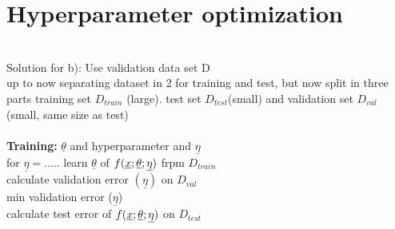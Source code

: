 \section{Hyperparameter optimization}
 \\
Solution for b): Use validation data set D\\
up to now separating dataset in 2 for training and test, but now split in three parts training set $ D_{train} $ (large). test set $ D_{test} $(small) and validation set $ D_{val} $ (small, same size as test)\\
 \\
\textbf{Training:} $ \underline{\theta} $ and hyperparameter and $ \underline{\eta} $\\
for $ \underline{\eta} = ..... $ learn $ \underline{\theta} $ of $ f({\underline x} ; \underline{\theta} ; \underline{\eta}) $ frpm $  D_{train} $\\
calculate validation error $ (\underline{\eta}) $ on $ D_{val} $\\
min validation error ($ \underline{\eta} $)\\
calculate test error of $ f({\underline x} ; \underline{\theta} ; \underline{\eta}) $ on $ D_{test} $\\
 \\

















